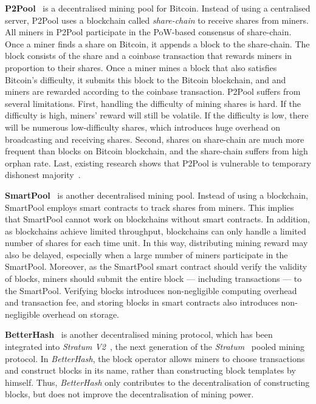 \textbf{P2Pool}~\cite{voight2011p2pool} is a decentralised mining pool for Bitcoin.
Instead of using a centralised server, P2Pool uses a blockchain called \emph{share-chain} to receive shares from miners.
All miners in P2Pool participate in the PoW-based consensus of share-chain.
Once a miner finds a share on Bitcoin, it appends a block to the share-chain.
The block consists of the share and a coinbase transaction that rewards miners in proportion to their shares.
Once a miner mines a block that also satisfies Bitcoin's difficulty, it submits this block to the Bitcoin blockchain, and and miners are rewarded according to the coinbase transaction.
P2Pool suffers from several limitations.
First, handling the difficulty of mining shares is hard.
If the difficulty is high, miners' reward will still be volatile.
If the difficulty is low, there will be numerous low-difficulty shares, which introduces huge overhead on broadcasting and receiving shares.
Second, shares on share-chain are much more frequent than blocks on Bitcoin blockchain, and the share-chain suffers from high orphan rate.
Last, existing research shows that P2Pool is vulnerable to temporary dishonest majority~\cite{decentralised-mining-pool-security}.

\textbf{SmartPool}~\cite{luu2017smartpool} is another decentralised mining pool.
Instead of using a blockchain, SmartPool employs smart contracts to track shares from miners.
This implies that SmartPool cannot work on blockchains without smart contracts.
In addition, as blockchains achieve limited throughput, blockchains can only handle a limited number of shares for each time unit.
In this way, distributing mining reward may also be delayed, especially when a large number of miners participate in the SmartPool.
Moreover, as the SmartPool smart contract should verify the validity of blocks, miners should submit the entire block --- including transactions --- to the SmartPool.
Verifying blocks introduces non-negligible computing overhead and transaction fee, and storing blocks in smart contracts also introduces non-negligible overhead on storage.



\textbf{BetterHash}~\cite{draft-bip-BetterHash} is another decentralised mining protocol, which has been integrated into \emph{Stratum V2}~\cite{stratum-v2}, the next generation of the \textit{Stratum}~\cite{stratum} pooled mining protocol.
In \textit{BetterHash}, the block operator allows miners to choose transactions and construct blocks in its name, rather than constructing block templates by himself.
Thus, \textit{BetterHash} only contributes to the decentralisation of constructing blocks, but does not improve the decentralisation of mining power.